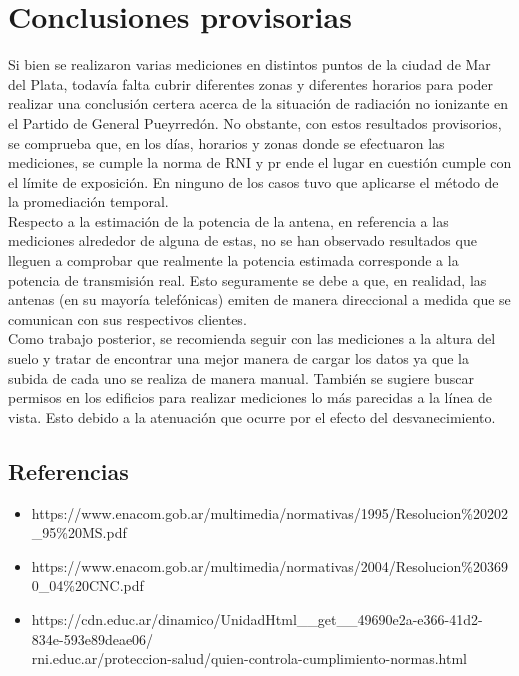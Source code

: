 \section{Conclusiones provisorias}
Si bien se realizaron varias mediciones en distintos puntos de la ciudad de Mar del Plata, todavía falta cubrir diferentes zonas y diferentes horarios para poder realizar una conclusión certera acerca de la situación de radiación no ionizante en el Partido de General Pueyrredón. No obstante, con estos resultados provisorios, se comprueba que, en los días, horarios y zonas donde se efectuaron las mediciones, se cumple la norma de RNI y pr ende el lugar en cuestión cumple con el límite de exposición. En ninguno de los casos tuvo que aplicarse el método de la promediación temporal. \\

Respecto a la estimación de la potencia de la antena, en referencia a las mediciones alrededor de alguna de estas, no se han observado resultados que lleguen a comprobar que realmente la potencia estimada corresponde a la potencia de transmisión real. Esto seguramente se debe a que, en realidad, las antenas (en su mayoría telefónicas) emiten de manera direccional a medida que se comunican con sus respectivos clientes. \\

Como trabajo posterior, se recomienda seguir con las mediciones a la altura del suelo y tratar de encontrar una mejor manera de cargar los datos ya que la subida de cada uno se realiza de manera manual. También se sugiere buscar permisos en los edificios para realizar mediciones lo más parecidas a la línea de vista. Esto debido a la atenuación que ocurre por el efecto del desvanecimiento.

\subsection*{Referencias}

\begin{itemize}
    \item https://www.enacom.gob.ar/multimedia/normativas/1995/Resolucion\%20202\_95\%20MS.pdf
    \item https://www.enacom.gob.ar/multimedia/normativas/2004/Resolucion\%203690\_04\%20CNC.pdf
    \item https://cdn.educ.ar/dinamico/UnidadHtml\_\_get\_\_49690e2a-e366-41d2-834e-593e89deae06/ \\
    rni.educ.ar/proteccion-salud/quien-controla-cumplimiento-normas.html
\end{itemize}






